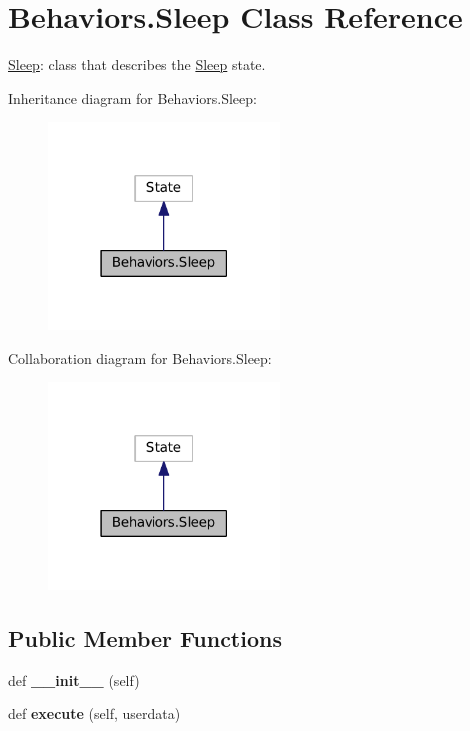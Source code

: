\hypertarget{classBehaviors_1_1Sleep}{}\section{Behaviors.\+Sleep Class Reference}
\label{classBehaviors_1_1Sleep}


\hyperlink{classBehaviors_1_1Sleep}{Sleep}\+: class that describes the \hyperlink{classBehaviors_1_1Sleep}{Sleep} state.  




Inheritance diagram for Behaviors.\+Sleep\+:\nopagebreak
\begin{figure}[H]
\begin{center}
\leavevmode
\includegraphics[width=174pt]{classBehaviors_1_1Sleep__inherit__graph}
\end{center}
\end{figure}


Collaboration diagram for Behaviors.\+Sleep\+:\nopagebreak
\begin{figure}[H]
\begin{center}
\leavevmode
\includegraphics[width=174pt]{classBehaviors_1_1Sleep__coll__graph}
\end{center}
\end{figure}
\subsection*{Public Member Functions}
\begin{DoxyCompactItemize}
\item 
def {\bfseries \+\_\+\+\_\+init\+\_\+\+\_\+} (self)\hypertarget{classBehaviors_1_1Sleep_accfb4124bccdbacf41004911ab15b447}{}\label{classBehaviors_1_1Sleep_accfb4124bccdbacf41004911ab15b447}

\item 
def {\bfseries execute} (self, userdata)\hypertarget{classBehaviors_1_1Sleep_ae2eb72a6c74a0c9154e7917550fafae4}{}\label{classBehaviors_1_1Sleep_ae2eb72a6c74a0c9154e7917550fafae4}

\end{DoxyCompactItemize}



